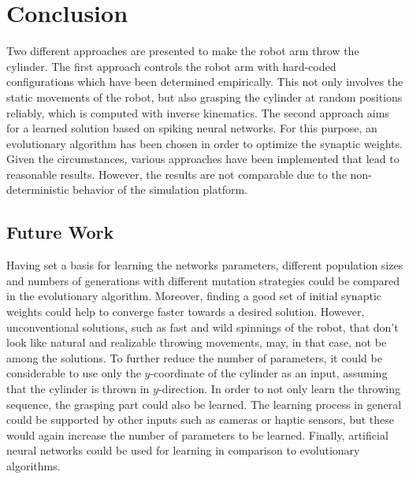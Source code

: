 \section{Conclusion}
\label{sec:conclusion}
Two different approaches are presented to make the robot arm throw the cylinder.
The first approach controls the robot arm with hard-coded configurations which have been determined empirically.
This not only involves the static movements of the robot, but also grasping the cylinder at random positions reliably, which is computed with inverse kinematics.
The second approach aims for a learned solution based on spiking neural networks.
For this purpose, an evolutionary algorithm has been chosen in order to optimize the synaptic weights.
Given the circumstances, various approaches have been implemented that lead to reasonable results.
However, the results are not comparable due to the non-deterministic behavior of the simulation platform.

\subsection{Future Work} %
\label{sub:future_work}
Having set a basis for learning the networks parameters, different population sizes and numbers of generations with different mutation strategies could be compared in the evolutionary algorithm.
Moreover, finding a good set of initial synaptic weights could help to converge faster towards a desired solution.
However, unconventional solutions, such as fast and wild spinnings of the robot, that don't look like natural and realizable throwing movements, may, in that case, not be among the solutions.
To further reduce the number of parameters, it could be considerable to use only the $y$-coordinate of the cylinder as an input, assuming that the cylinder is thrown in $y$-direction.
In order to not only learn the throwing sequence, the grasping part could also be learned.
The learning process in general could be supported by other inputs such as cameras or haptic sensors, but these would again increase the number of parameters to be learned.
Finally, artificial neural networks could be used for learning in comparison to evolutionary algorithms.

